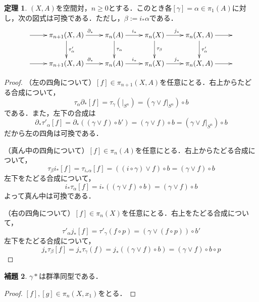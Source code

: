 \documentclass[a4paper,11pt]{jsarticle}
\theoremstyle{definition}
\newtheorem{thm}{定理}[section]
\newtheorem{lem}[thm]{補題}
\begin{document}
\begin{thm}
  $(X,A)$を空間対，$n\ge 0$とする．このとき各$[\gamma]=\alpha\in\pi_1(A)$に対し，次の図式は可換である．ただし，$\beta:=i_*\alpha$である．
  \[
    \xymatrix{
      \ar[r]
      &\pi_{n+1}(X,A)\ar[r]^{\partial_*}\ar[d]^{\tau'_\alpha}
      &\pi_n(A)\ar[r]^{i_*}\ar[d]^{\tau_\alpha}
      &\pi_n(X)\ar[r]^{j_*}\ar[d]^{\tau_\beta}
      &\pi_n(X,A)\ar[r]\ar[d]^{\tau'_\alpha}
      &\\
      \ar[r]
      &\pi_{n+1}(X,A)\ar[r]^{\partial_*}
      &\pi_n(A)\ar[r]^{i_*}
      &\pi_n(X)\ar[r]^{j_*}
      &\pi_n(X,A)\ar[r]
      &
    }
  \]
\end{thm}
\begin{proof}
  （左の四角について）$[f]\in\pi_{n+1}(X,A)$を任意にとる．右上からたどる合成について，
  \[
    \tau_\alpha\partial_*[f]=\tau_\gamma(|_{S^n})=(\gamma\vee f|_{S^n})\circ b
  \]
  である．また，左下の合成は
  \[
    \partial_*\tau'_\alpha[f]=\partial_*((\gamma\vee f)\circ b')=(\gamma\vee f)\circ b=(\gamma\vee f|_{S^n})\circ b
  \]だから左の四角は可換である．

  （真ん中の四角について）$[f]\in \pi_n(A)$を任意にとる．右上からたどる合成について，
  \[
    \tau_\beta i_*[f]=\tau_{i_*\alpha}[f]=((i\circ\gamma)\vee f)\circ b=(\gamma\vee f)\circ b
  \]
  左下をたどる合成について，
  \[
    i_*\tau_\alpha[f]=i_*((\gamma\vee f)\circ b)=(\gamma\vee f)\circ b
  \]よって真ん中は可換である．

  （右の四角について）$[f]\in\pi_n(X)$を任意にとる．右上をたどる合成について，
  \[
    \tau'_\alpha j_*[f]=\tau'_\gamma(f\circ p)=(\gamma\vee (f\circ p))\circ b'
  \]左下をたどる合成について，
  \[
    j_*\tau_\beta[f]=j_*\tau_\gamma(f)=j_*((\gamma\vee f)\circ b)=(\gamma\vee f)\circ b\circ p
  \]
\end{proof}
\begin{lem}$\gamma*$は群準同型である．
\end{lem}
\begin{proof}
  $[f],[g]\in \pi_n(X,x_1)$をとる．
\end{proof}
\end{document}
